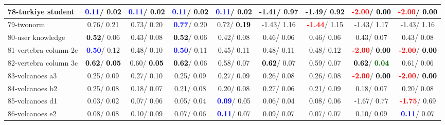 \begin{table}[h]
\begin{center}
\begin{tabular}{lc|c|c|c|c|c|c|c}
78-turkiye student & \textcolor{blue}{\textbf{  0.11}}/  0.02 & \textcolor{blue}{\textbf{  0.11}}/  0.02 & \textcolor{blue}{\textbf{  0.11}}/  0.02 & \textcolor{blue}{\textbf{  0.11}}/  0.02 &  -1.41/  0.97 &  -1.49/  0.92 & \textcolor{red}{\textbf{ -2.00}}/\textcolor{black}{\textbf{  0.00}} & \textcolor{red}{\textbf{ -2.00}}/\textcolor{black}{\textbf{  0.00}} \\ \hline
79-twonorm &   0.76/  0.21 &   0.73/  0.20 & \textcolor{blue}{\textbf{  0.77}}/  0.20 &   0.72/\textcolor{black}{\textbf{  0.19}} &  -1.43/  1.16 & \textcolor{red}{\textbf{ -1.44}}/  1.15 &  -1.43/  1.17 &  -1.43/  1.16 \\
80-user knowledge & \textcolor{black}{\textbf{  0.52}}/  0.06 &   0.43/  0.08 & \textcolor{black}{\textbf{  0.52}}/  0.06 &   0.42/  0.08 &   0.46/  0.06 &   0.46/  0.06 &   0.43/  0.07 &   0.43/  0.08 \\
81-vertebra column 2c & \textcolor{blue}{\textbf{  0.50}}/  0.12 &   0.48/  0.10 & \textcolor{blue}{\textbf{  0.50}}/  0.11 &   0.45/  0.11 &   0.48/  0.11 &   0.48/  0.12 & \textcolor{red}{\textbf{ -2.00}}/\textcolor{black}{\textbf{  0.00}} & \textcolor{red}{\textbf{ -2.00}}/\textcolor{black}{\textbf{  0.00}} \\
82-vertebra column 3c & \textcolor{black}{\textbf{  0.62}}/\textcolor{black}{\textbf{  0.05}} &   0.60/\textcolor{black}{\textbf{  0.05}} & \textcolor{black}{\textbf{  0.62}}/  0.06 &   0.58/  0.07 & \textcolor{black}{\textbf{  0.62}}/  0.07 &   0.59/  0.07 & \textcolor{black}{\textbf{  0.62}}/\textcolor{darkgreen}{\textbf{  0.04}} &   0.61/  0.06 \\
83-volcanoes a3 &   0.25/  0.09 &   0.27/  0.10 &   0.25/  0.09 &   0.27/  0.09 &   0.26/  0.08 &   0.26/  0.08 & \textcolor{red}{\textbf{ -2.00}}/\textcolor{black}{\textbf{  0.00}} & \textcolor{red}{\textbf{ -2.00}}/\textcolor{black}{\textbf{  0.00}} \\
84-volcanoes b2 &   0.25/  0.08 &   0.18/  0.07 &   0.21/  0.08 &   0.20/  0.08 &   0.27/  0.06 &   0.21/  0.09 &   0.18/  0.07 &   0.20/  0.08 \\
85-volcanoes d1 &   0.03/  0.02 &   0.07/  0.06 &   0.05/  0.04 & \textcolor{blue}{\textbf{  0.09}}/  0.05 &   0.06/  0.04 &   0.08/  0.06 &  -1.67/  0.77 & \textcolor{red}{\textbf{ -1.75}}/  0.69 \\ \hline
86-volcanoes e2 &   0.08/  0.08 &   0.10/  0.09 &   0.07/  0.06 & \textcolor{blue}{\textbf{  0.11}}/  0.07 &   0.09/  0.07 &   0.07/  0.07 &   0.10/  0.09 & \textcolor{blue}{\textbf{  0.11}}/  0.07 \\

\end{tabular}
\end{center}
\end{table}
